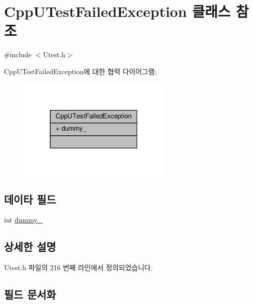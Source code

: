 \hypertarget{class_cpp_u_test_failed_exception}{}\section{Cpp\+U\+Test\+Failed\+Exception 클래스 참조}
\label{class_cpp_u_test_failed_exception}


{\ttfamily \#include $<$Utest.\+h$>$}



Cpp\+U\+Test\+Failed\+Exception에 대한 협력 다이어그램\+:
\nopagebreak
\begin{figure}[H]
\begin{center}
\leavevmode
\includegraphics[width=211pt]{class_cpp_u_test_failed_exception__coll__graph}
\end{center}
\end{figure}
\subsection*{데이타 필드}
\begin{DoxyCompactItemize}
\item 
int \hyperlink{class_cpp_u_test_failed_exception_a124381edd0726eaabbad6607eb02ae3b}{dummy\+\_\+}
\end{DoxyCompactItemize}


\subsection{상세한 설명}


Utest.\+h 파일의 216 번째 라인에서 정의되었습니다.



\subsection{필드 문서화}
